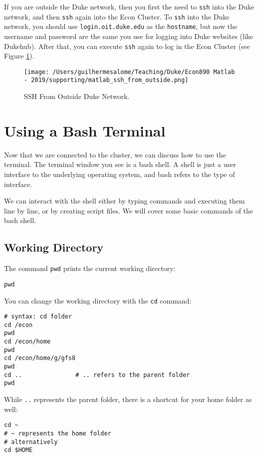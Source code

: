 \documentclass[12pt, a4paper]{article}
\begin{document}
If you are outside the Duke network, then you first the need to \texttt{ssh} into the Duke network, and then \texttt{ssh} again into the Econ Cluster.
To \texttt{ssh} into the Duke network, you should use \texttt{login.oit.duke.edu} as the \texttt{hostname}, but now the username and password are the same you use for logging into Duke websites (like Dukehub).
After that, you can execute \texttt{ssh} again to log in the Econ Cluster (see Figure \ref{fig:orgb49990c}).

\begin{figure}[H]
\centering
\texttt{[image: /Users/guilhermesalome/Teaching/Duke/Econ890 Matlab - 2019/supporting/matlab\_ssh\_from\_outside.png]}
\caption{\label{fig:orgb49990c}
SSH From Outside Duke Network.}
\end{figure}
\section{Using a Bash Terminal}
\label{sec:orgb85e659}
Now that we are connected to the cluster, we can discuss how to use the terminal.
The terminal window you see is a bash shell.
A shell is just a user interface to the underlying operating system, and bash refers to the type of interface.

We can interact with the shell either by typing commands and executing them line by line, or by creating script files.
We will cover some basic commands of the bash shell.
\subsection{Working Directory}
\label{sec:org01b87cf}
The command \texttt{pwd} prints the current working directory:
\lstset{language=bash,label= ,caption= ,captionpos=b,firstnumber=1,numbers=left,style=bash}
\begin{lstlisting}
pwd
\end{lstlisting}
You can change the working directory with the \texttt{cd} command:
\lstset{language=bash,label= ,caption= ,captionpos=b,firstnumber=1,numbers=left,style=bash}
\begin{lstlisting}
# syntax: cd folder
cd /econ
pwd
cd /econ/home
pwd
cd /econ/home/g/gfs8
pwd
cd ..				# .. refers to the parent folder
pwd
\end{lstlisting}
While \texttt{..} represents the parent folder, there is a shortcut for your home folder as well:
\lstset{language=bash,label= ,caption= ,captionpos=b,firstnumber=1,numbers=left,style=bash}
\begin{lstlisting}
cd ~
# ~ represents the home folder
# alternatively
cd $HOME
\end{lstlisting}
\end{document}

